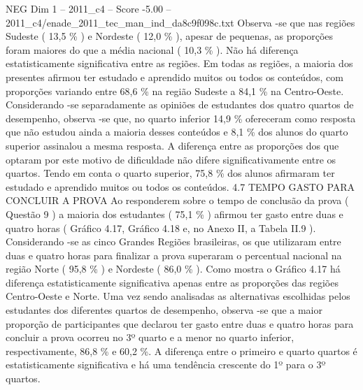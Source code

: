 \begin{textsample}{NEG Dim 1 – 2011\_c4 – Score -5.00 – 2011\_c4/enade\_2011\_tec\_man\_ind\_da8c9f098c.txt}
Observa -se que nas regiões Sudeste ( 13,5 \% ) e Nordeste ( 12,0 \% ), apesar de pequenas, as proporções foram maiores do que a média nacional ( 10,3 \% ).
Não há diferença estatisticamente significativa entre as regiões.
Em todas as regiões, a maioria dos presentes afirmou ter estudado e aprendido muitos ou todos os conteúdos, com proporções variando entre 68,6 \% na região Sudeste a 84,1 \% na Centro-Oeste.
Considerando -se separadamente as opiniões de estudantes dos quatro quartos de desempenho, observa -se que, no quarto inferior 14,9 \% ofereceram como resposta que não estudou ainda a maioria desses conteúdos e 8,1 \% dos alunos do quarto superior assinalou a mesma resposta.
A diferença entre as proporções dos que optaram por este motivo de dificuldade não difere significativamente entre os quartos.
Tendo em conta o quarto superior, 75,8 \% dos alunos afirmaram ter estudado e aprendido muitos ou todos os conteúdos. 4.7 TEMPO GASTO PARA CONCLUIR A PROVA Ao responderem sobre o tempo de conclusão da prova ( Questão 9 ) a maioria dos estudantes ( 75,1 \% ) afirmou ter gasto entre duas e quatro horas ( Gráfico 4.17, Gráfico 4.18 e, no Anexo II, a Tabela II.9 ).
Considerando -se as cinco Grandes Regiões brasileiras, os que utilizaram entre duas e quatro horas para finalizar a prova superaram o percentual nacional na região Norte ( 95,8 \% ) e Nordeste ( 86,0 \% ).
Como mostra o Gráfico 4.17 há diferença estatisticamente significativa apenas entre as proporções das regiões Centro-Oeste e Norte.
Uma vez sendo analisadas as alternativas escolhidas pelos estudantes dos diferentes quartos de desempenho, observa -se que a maior proporção de participantes que declarou ter gasto entre duas e quatro horas para concluir a prova ocorreu no 3º quarto e a menor no quarto inferior, respectivamente, 86,8 \% e 60,2 \%.
A diferença entre o primeiro e quarto quartos é estatisticamente significativa e há uma tendência crescente do 1º para o 3º quartos.

\end{textsample}
